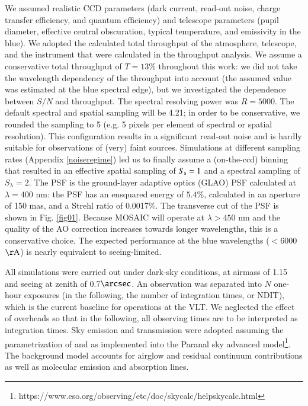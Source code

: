 \documentclass{aa}
\begin{document}
We assumed realistic CCD parameters (dark current, read-out noise, charge transfer efficiency, and quantum efficiency) and telescope parameters (pupil diameter, effective central obscuration, typical temperature, and emissivity in the blue). We adopted the calculated total throughput of the atmosphere, telescope, and the instrument that were calculated in the throughput analysis. We assume a conservative total throughput of $T = 13\%$ throughout this work: we did not take the wavelength dependency of the throughput  into account (the assumed value was estimated at the blue spectral edge), but we investigated the dependence between $S/N$ and throughput. The spectral resolving power was $R = 5000$. The default spectral and spatial sampling will be 4.21; in order to be conservative, we rounded the sampling to 5 (e.g. 5 pixels per element of spectral or spatial resolution). This configuration results in a significant read-out noise and is hardly suitable for observations of (very) faint sources. Simulations at different sampling rates (Appendix \ref{noiseregime}) led us to finally assume a (on-the-ccd) binning that resulted in an effective spatial sampling of $S_{\rm s} = 1$ and a spectral sampling of $S_{\lambda} = 2$. The PSF is the ground-layer adaptive optics (GLAO) PSF calculated at $\lambda = 400$ nm: the PSF has an ensquared energy of $5.4 \%$, calculated in an aperture of 150 mas, and a Strehl ratio of 0.0017$\%$. The transverse cut of the PSF is shown in Fig. \ref{fig01}. Because MOSAIC will operate at $\lambda > 450$ nm and the quality of the AO correction increases towards longer wavelengths, this is a conservative choice. The expected performance at the blue wavelengths ($<6000$ $\mathrm{\AA}$) is nearly equivalent to seeing-limited.

All simulations were carried out under dark-sky conditions, at airmass of 1.15 and seeing at zenith of 0.7$\arcsec$. An observation was separated into $N$ one-hour exposures (in the following, the number of integration times, or NDIT), which is the current baseline for operations at the VLT. We neglected the effect of overheads so that in the following, all observing times are to be interpreted as integration times. Sky emission and transmission were adopted assuming the parametrization of \citet{Noll2012} and \citet{Jones2013} as implemented into the Paranal sky advanced model\footnote{https://www.eso.org/observing/etc/doc/skycalc/helpskycalc.html}. The background model accounts for airglow and residual continuum contributions as well as molecular emission and absorption lines.
\end{document}

